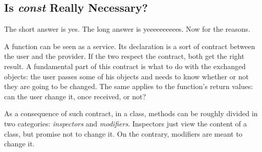 \documentclass[a4paper]{article}
\begin{document}
\subsection{Is {\it const} Really Necessary?}
\label{subsec:const}
The short answer is yes. The long answer is yeeeeeeeeees. Now for the
reasons.

A function can be seen as a service. Its declaration is a sort of
contract between the user and the provider. If the two respect the
contract, both get the right result. A fundamental part of this
contract is what to do with the exchanged objects: the user passes
some of his objects and needs to know whether or not they are going
to be changed. The same applies to the function's return values: can
the user change it, once received, or not?

As a consequence of such contract, in a class, methods can be roughly
divided in two categories: {\it inspectors} and {\it
modifiers}. Inspectors just view the content of a class, but promise
not to change it. On the contrary, modifiers are meant to change it.
\end{document}
